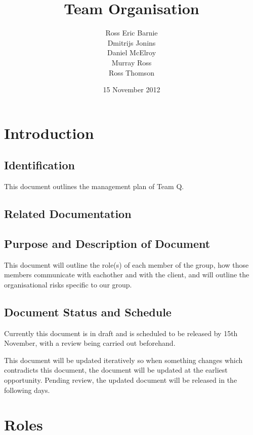 \documentclass{l3deliverable}
\title{Team Organisation}
\author{
  Ross Eric Barnie \\
  Dmitrijs Jonins \\
  Daniel McElroy \\
  Murray Ross \\
  Ross Thomson
}
\date{15 November 2012}
\begin{document}

\maketitle


\section{Introduction}

\subsection{Identification}

This document outlines the management plan of Team Q.

\subsection{Related Documentation}


\subsection{Purpose and Description of Document}

This document will outline the role(s) of each member of the group, how those
members communicate with eachother and with the client, and will outline the
organisational risks specific to our group.

\subsection{Document Status and Schedule}

Currently this document is in draft and is scheduled to be released by 15th
November, with a review being carried out beforehand.

This document will be updated iteratively so when something changes which
contradicts this document, the document will be updated at the earliest
opportunity.
Pending review, the updated document will be released in the following days.


\section{Roles}
\end{document}

